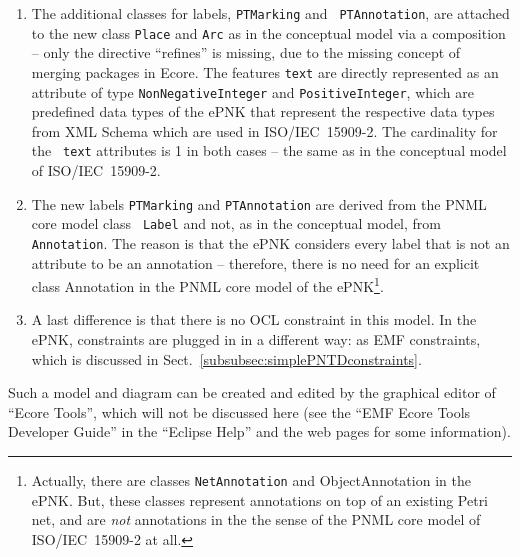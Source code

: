 \begin{enumerate}
  \item The additional classes for labels, {\tt PTMarking} and {\tt
        PTAnnotation}, are attached to the new class {\tt Place} and {\tt Arc}
        as in the conceptual model via a composition -- only the directive ``refines'' is
        missing, due to the missing concept of merging packages in Ecore. The
        features {\tt text} are directly represented as an attribute of type
        {\tt NonNegativeInteger} and {\tt PositiveInteger}, which are predefined
        data types of the ePNK that represent the respective data types from XML
        Schema which are used in ISO/IEC~15909-2. The cardinality for the {\tt
        text} attributes is 1 in both cases -- the same as in the conceptual model
        of ISO/IEC~15909-2.
        
  \item The new labels {\tt PTMarking} and 
        {\tt PTAnnotation} are derived from the PNML core model class {\tt
        Label} and not, as in the conceptual model, from {\tt Annotation}.
        The reason is that the ePNK considers every label that is not
        an attribute to be an annotation -- therefore, there is no
        need for an explicit class {\sf Annotation} in the PNML core model
        of the ePNK\footnote
          {Actually, there are classes {\tt NetAnnotation} and {\sf ObjectAnnotation}
           in the ePNK. But, these classes represent annotations on top of
           an existing Petri net, and are  \emph{not} annotations in the
           the sense of the PNML core model of ISO/IEC~15909-2 at all.}.

  \item A last difference is that there is no OCL constraint in this model.
        In the ePNK, constraints are plugged in in a different way: as
        EMF constraints, which is discussed in
        Sect.~\ref{subsubsec:simplePNTDconstraints}.
\end{enumerate}

Such a model and diagram can be created and edited by the graphical
editor of ``Ecore Tools'', which will not be discussed here (see the ``EMF Ecore
Tools Developer Guide'' in the ``Eclipse Help'' and the web pages for some information).

